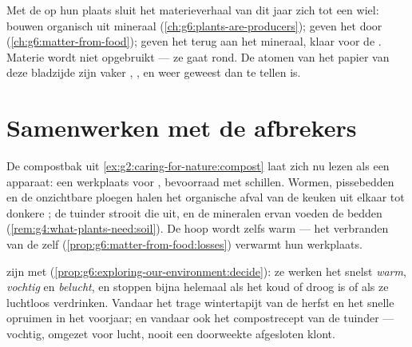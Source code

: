 \begin{remark}\label{rem:g6:decomposers-and-soil:circle}
Met de  op hun plaats sluit het materieverhaal van dit jaar zich
tot een wiel:  bouwen organisch uit mineraal
(\cref{ch:g6:plants-are-producers});  geven het door
(\cref{ch:g6:matter-from-food});  geven het terug aan het
mineraal, klaar voor de . Materie wordt niet opgebruikt ---
ze gaat rond. De atomen van het papier van deze bladzijde zijn vaker ,
,  en weer  geweest dan te tellen is.
\end{remark}

\section{Samenwerken met de afbrekers}

\begin{example}\label{ex:g6:decomposers-and-soil:compost}
De compostbak uit \cref{ex:g2:caring-for-nature:compost} laat zich nu
lezen als een apparaat: een werkplaats voor , bevoorraad met
schillen. Wormen, pissebedden en de onzichtbare ploegen halen het
organische afval van de keuken uit elkaar tot donkere ; de tuinder
strooit die uit, en de mineralen ervan voeden de bedden
(\cref{rem:g4:what-plants-need:soil}). De hoop wordt zelfs warm --- het
verbranden van de  zelf
(\cref{prop:g6:matter-from-food:losses}) verwarmt hun werkplaats.
\end{example}

\begin{proposition}\label{prop:g6:decomposers-and-soil:speed}
 zijn  met 
(\cref{prop:g6:exploring-our-environment:decide}): ze werken het snelst
\emph{warm}, \emph{vochtig} en \emph{belucht}, en stoppen bijna helemaal
als het koud of droog is of als ze luchtloos verdrinken. Vandaar het
trage wintertapijt van de herfst en het snelle opruimen in het voorjaar;
en vandaar ook het compostrecept van de tuinder --- vochtig, omgezet voor
lucht, nooit een doorweekte afgesloten klont.
\end{proposition}
\admitted

